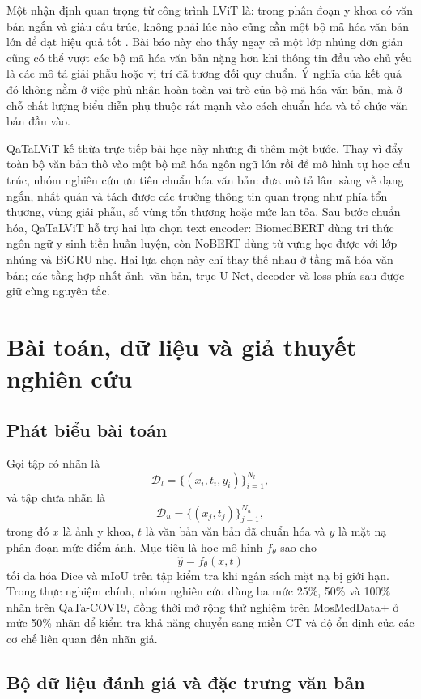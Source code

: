 Một nhận định quan trọng từ công trình LViT là: trong phân đoạn y khoa có văn bản ngắn và giàu cấu trúc, không phải lúc nào cũng cần một bộ mã hóa văn bản lớn để đạt hiệu quả tốt \cite{li2023lvit}. Bài báo này cho thấy ngay cả một lớp nhúng đơn giản cũng có thể vượt các bộ mã hóa văn bản nặng hơn khi thông tin đầu vào chủ yếu là các mô tả giải phẫu hoặc vị trí đã tương đối quy chuẩn. Ý nghĩa của kết quả đó không nằm ở việc phủ nhận hoàn toàn vai trò của bộ mã hóa văn bản, mà ở chỗ chất lượng biểu diễn phụ thuộc rất mạnh vào cách chuẩn hóa và tổ chức văn bản đầu vào.

QaTaLViT kế thừa trực tiếp bài học này nhưng đi thêm một bước. Thay vì đẩy toàn bộ văn bản thô vào một bộ mã hóa ngôn ngữ lớn rồi để mô hình tự học cấu trúc, nhóm nghiên cứu ưu tiên chuẩn hóa văn bản: đưa mô tả lâm sàng về dạng ngắn, nhất quán và tách được các trường thông tin quan trọng như phía tổn thương, vùng giải phẫu, số vùng tổn thương hoặc mức lan tỏa. Sau bước chuẩn hóa, QaTaLViT hỗ trợ hai lựa chọn text encoder: BiomedBERT dùng tri thức ngôn ngữ y sinh tiền huấn luyện, còn NoBERT dùng từ vựng học được với lớp nhúng và BiGRU nhẹ. Hai lựa chọn này chỉ thay thế nhau ở tầng mã hóa văn bản; các tầng hợp nhất ảnh--văn bản, trục U-Net, decoder và loss phía sau được giữ cùng nguyên tắc.

\section{Bài toán, dữ liệu và giả thuyết nghiên cứu}
\label{sec:data}

\subsection{Phát biểu bài toán}

Gọi tập có nhãn là
\[
\mathcal{D}_l = \{(x_i, t_i, y_i)\}_{i=1}^{N_l},
\]
và tập chưa nhãn là
\[
\mathcal{D}_u = \{(x_j, t_j)\}_{j=1}^{N_u},
\]
trong đó \(x\) là ảnh y khoa, \(t\) là văn bản văn bản đã chuẩn hóa và \(y\) là mặt nạ phân đoạn mức điểm ảnh. Mục tiêu là học mô hình \(f_\theta\) sao cho
\[
\hat{y} = f_\theta(x, t)
\]
tối đa hóa Dice và mIoU trên tập kiểm tra khi ngân sách mặt nạ bị giới hạn. Trong thực nghiệm chính, nhóm nghiên cứu dùng ba mức 25\%, 50\% và 100\% nhãn trên QaTa-COV19, đồng thời mở rộng thử nghiệm trên MosMedData+ ở mức 50\% nhãn để kiểm tra khả năng chuyển sang miền CT và độ ổn định của các cơ chế liên quan đến nhãn giả.

\subsection{Bộ dữ liệu đánh giá và đặc trưng văn bản}

